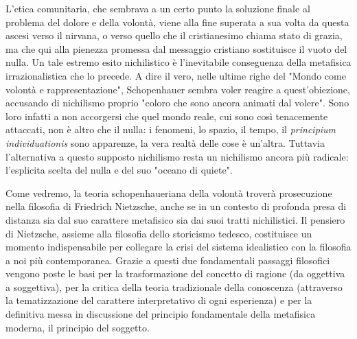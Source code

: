  L’etica comunitaria, che sembrava a un certo punto la soluzione finale al problema del dolore e della volontà, viene alla fine superata a sua volta da questa ascesi verso il nirvana, o verso quello che il cristianesimo chiama stato di grazia, ma che qui alla pienezza promessa dal messaggio cristiano sostituisce il vuoto del nulla. Un tale estremo esito nichilistico è l’inevitabile conseguenza della metafisica irrazionalistica che lo precede. A dire il vero, nelle ultime righe del "Mondo come volontà e rappresentazione", Schopenhauer sembra voler reagire a quest’obiezione, accusando di nichilismo proprio "coloro che sono ancora animati dal volere". Sono loro infatti a non accorgersi che quel mondo reale, cui sono così tenacemente attaccati, non è altro che il nulla: i fenomeni, lo spazio, il tempo, il \textit{principium individuationis} sono apparenze, la vera realtà delle cose è un’altra. Tuttavia l’alternativa a questo supposto nichilismo resta un nichilismo ancora più radicale: l’esplicita scelta del nulla e del suo "oceano di quiete". 
 
 Come vedremo, la teoria schopenhaueriana della volontà troverà prosecuzione nella filosofia di Friedrich Nietzsche, anche se in un contesto di profonda presa di distanza sia dal suo carattere metafisico sia dai suoi tratti nichilistici. Il pensiero di Nietzsche, assieme alla filosofia dello storicismo tedesco, costituisce un momento indispensabile per collegare la crisi del sistema idealistico con la filosofia a noi più contemporanea. Grazie a questi due fondamentali passaggi filosofici vengono poste le basi per la trasformazione del concetto di ragione (da oggettiva a soggettiva), per la critica della teoria tradizionale della conoscenza (attraverso la tematizzazione del carattere interpretativo di ogni esperienza) e per la definitiva messa in discussione del principio fondamentale della metafisica moderna, il principio del soggetto.
